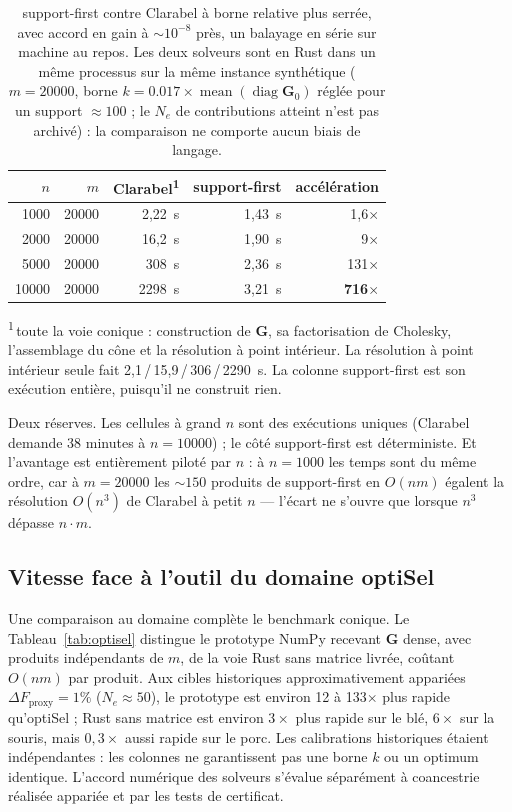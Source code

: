 \documentclass[11pt]{article}
\newcommand{\bG}{\mathbf{G}}
\begin{document}
\begin{table}[ht]
\centering
\caption{support-first contre Clarabel à borne relative plus serrée, avec accord en gain à ${\sim}10^{-8}$ près, un balayage en série sur machine au repos. Les deux solveurs sont en Rust dans un même processus sur la même instance synthétique ($m=20000$, borne $k=0.017\times\operatorname{mean}(\operatorname{diag}\bG_0)$ réglée pour un support ${\approx}100$ ; le $N_e$ de contributions atteint n'est pas archivé) : la comparaison ne comporte aucun biais de langage.}
\label{tab:clarabel}
\begin{tabular}{rrrrr}
\toprule
$n$ & $m$ & Clarabel\textsuperscript{1} & support-first & accélération \\
\midrule
1000  & 20000 & 2,22~s   & 1,43~s & 1,6$\times$ \\
2000  & 20000 & 16,2~s   & 1,90~s & 9$\times$ \\
5000  & 20000 & 308~s    & 2,36~s & 131$\times$ \\
10000 & 20000 & 2298~s   & 3,21~s & \textbf{716$\times$} \\
\bottomrule
\end{tabular}
\end{table}

\noindent\textsuperscript{1}\,toute la voie conique : construction de $\bG$, sa factorisation de Cholesky, l'assemblage du cône et la résolution à point intérieur. La résolution à point intérieur seule fait 2,1\,/\,15,9\,/\,306\,/\,2290~s. La colonne support-first est son exécution entière, puisqu'il ne construit rien.

Deux réserves. Les cellules à grand $n$ sont des exécutions uniques (Clarabel demande 38 minutes à $n=10000$) ; le côté support-first est déterministe. Et l'avantage est entièrement piloté par $n$ : à $n=1000$ les temps sont du même ordre, car à $m=20000$ les ${\sim}150$ produits de support-first en $O(nm)$ égalent la résolution $O(n^3)$ de Clarabel à petit $n$ --- l'écart ne s'ouvre que lorsque $n^3$ dépasse $n\cdot m$.

\subsection{Vitesse face à l'outil du domaine optiSel}

Une comparaison au domaine complète le benchmark conique. Le Tableau~\ref{tab:optisel} distingue le prototype NumPy recevant $\bG$ dense, avec produits indépendants de $m$, de la voie Rust sans matrice livrée, coûtant $O(nm)$ par produit. Aux cibles historiques approximativement appariées $\Delta F_{\mathrm{proxy}}=1\%$ ($N_e\approx50$), le prototype est environ 12 à 133$\times$ plus rapide qu'optiSel ; Rust sans matrice est environ $3\times$ plus rapide sur le blé, $6\times$ sur la souris, mais $0{,}3\times$ aussi rapide sur le porc. Les calibrations historiques étaient indépendantes : les colonnes ne garantissent pas une borne $k$ ou un optimum identique. L'accord numérique des solveurs s'évalue séparément à coancestrie réalisée appariée et par les tests de certificat.
\end{document}
